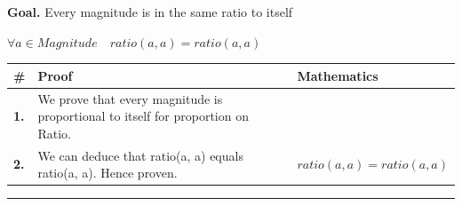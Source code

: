 \documentclass[11pt]{article}
\theoremstyle{definition}
\begin{document}
\medskip
\noindent\textbf{Goal.} Every magnitude is in the same ratio to itself\par
\noindent$\displaystyle \forall a \in Magnitude\quad ratio(a, a) = ratio(a, a)$\par
\medskip
\noindent
\begin{tabular}{@{} >{\raggedright\arraybackslash}p{} >{\raggedright\arraybackslash}p{} >{\raggedleft\arraybackslash}p{} @{}}
\textbf{\#} & \textbf{Proof} & \textbf{Mathematics} \\
\midrule
\textbf{1.} & We prove that every magnitude is proportional to itself for proportion on Ratio. & \\[0.45em]
\textbf{2.} & We can deduce that ratio(a, a) equals ratio(a, a). Hence proven. & $\displaystyle ratio(a, a) = ratio(a, a)$ \\[0.45em]
\bottomrule
\end{tabular}
\label{thm:Ratio-proportion-every_magnitude_is_proportional_to_itself}
\par\medskip\hrule
\end{document}
